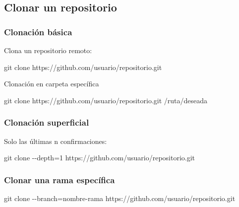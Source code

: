 \documentclass[
  doc,
  floatsintext,
  longtable,
  a4paper,
  nolmodern,
  notxfonts,
  notimes,
  colorlinks=true,linkcolor=blue,citecolor=blue,urlcolor=blue]{apa7}
\newenvironment{Shaded}{\begin{snugshade}}{\end{snugshade}}
\newcommand{\AttributeTok}[1]{\textcolor[rgb]{0.40,0.45,0.13}{#1}}
\newcommand{\FunctionTok}[1]{\textcolor[rgb]{0.28,0.35,0.67}{#1}}
\newcommand{\NormalTok}[1]{\textcolor[rgb]{0.00,0.23,0.31}{#1}}
\newcommand{\OperatorTok}[1]{\textcolor[rgb]{0.37,0.37,0.37}{#1}}
\begin{document}
\subsection{Clonar un repositorio}\label{clonar-un-repositorio}

\subsubsection{Clonación básica}\label{clonaciuxf3n-buxe1sica}

Clona un repositorio remoto:

\begin{Shaded}
\begin{Highlighting}[]
\FunctionTok{git}\NormalTok{ clone https://github.com/usuario/repositorio.git}
\end{Highlighting}
\end{Shaded}

Clonación en carpeta específica

\begin{Shaded}
\begin{Highlighting}[]
\FunctionTok{git}\NormalTok{ clone https://github.com/usuario/repositorio.git /ruta/deseada}
\end{Highlighting}
\end{Shaded}

\subsubsection{Clonación superficial}\label{clonaciuxf3n-superficial}

Solo las últimas n confirmaciones:

\begin{Shaded}
\begin{Highlighting}[]
\FunctionTok{git}\NormalTok{ clone }\AttributeTok{{-}{-}depth}\OperatorTok{=}\NormalTok{1 https://github.com/usuario/repositorio.git}
\end{Highlighting}
\end{Shaded}

\subsubsection{Clonar una rama
específica}\label{clonar-una-rama-especuxedfica}

\begin{Shaded}
\begin{Highlighting}[]
\FunctionTok{git}\NormalTok{ clone }\AttributeTok{{-}{-}branch}\OperatorTok{=}\NormalTok{nombre{-}rama https://github.com/usuario/repositorio.git}
\end{Highlighting}
\end{Shaded}
\end{document}
